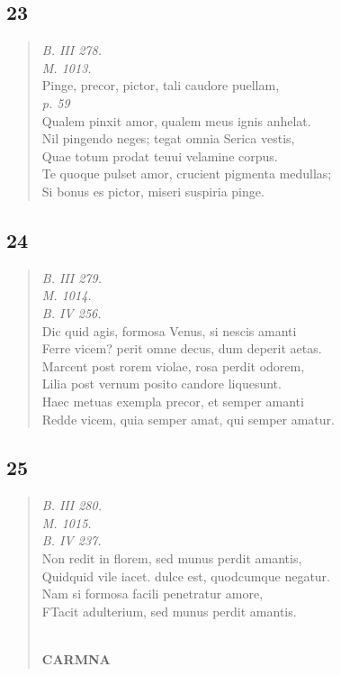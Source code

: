 \documentclass[11pt, a4paper]{report}
\begin{document}
            \subsection*{23}
      \begin{verse}
      \textit{B. III 278.} \\ \textit{M. 1013.} \\ Pinge, precor, pictor, tali caudore puellam, \\ \textit{p. 59} \\ Qualem pinxit amor, qualem meus ignis anhelat. \\ Nil pingendo neges; tegat omnia Serica vestis, \\ Quae totum prodat teuui velamine corpus. \\ Te quoque pulset amor, crucient pigmenta medullas; \\ Si bonus es pictor, miseri suspiria pinge. \\ 
      \end{verse}
  
            \subsection*{24}
      \begin{verse}
      \textit{B. III 279.} \\ \textit{M. 1014.} \\ \textit{B. IV 256.} \\ Dic quid agis, formosa Venus, si nescis amanti \\ Ferre vicem? perit omne decus, dum deperit aetas. \\ Marcent post rorem violae, rosa perdit odorem, \\ Lilia post vernum posito candore liquesunt. \\ Haec metuas exempla precor, et semper amanti \\ Redde vicem, quia semper amat, qui semper amatur. \\ 
      \end{verse}
  
            \subsection*{25}
      \begin{verse}
      \textit{B. III 280.} \\ \textit{M. 1015.} \\ \textit{B. IV 237.} \\ Non redit in florem, sed munus perdit amantis, \\ Quidquid vile iacet. dulce est, quodcumque negatur. \\ Nam si formosa facili penetratur amore, \\ FTacit adulterium, sed munus perdit amantis. \\ 
        ﻿\pagebreak 
     \marginpar{[98]} \begin{center} \textbf{CARMNA} \end{center}
      \end{verse}
  
\end{document}
